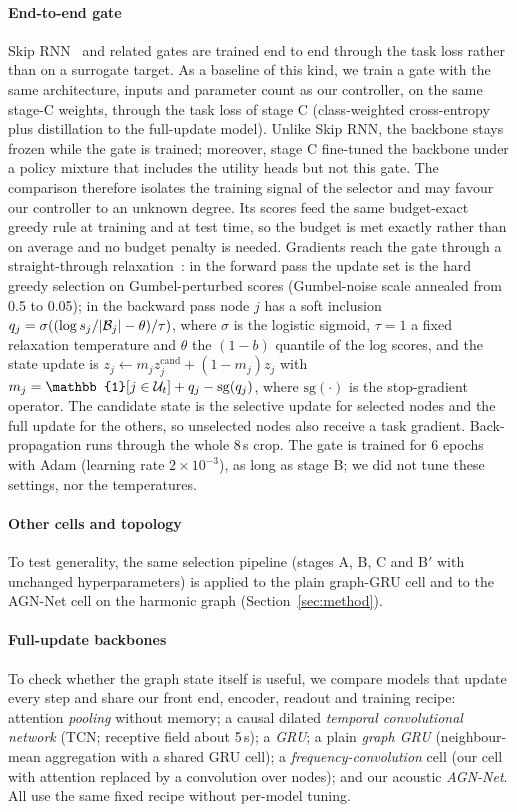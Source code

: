 \paragraph*{End-to-end gate} Skip RNN~\cite{campos2018skip} and related gates are trained end to end through the task loss rather than on a surrogate target. As a baseline of this kind, we train a gate with the same architecture, inputs and parameter count as our controller, on the same stage-C weights, through the task loss of stage C (class-weighted cross-entropy plus distillation to the full-update model). Unlike Skip RNN, the backbone stays frozen while the gate is trained; moreover, stage C fine-tuned the backbone under a policy mixture that includes the utility heads but not this gate. The comparison therefore isolates the training signal of the selector and may favour our controller to an unknown degree. Its scores feed the same budget-exact greedy rule at training and at test time, so the budget is met exactly rather than on average and no budget penalty is needed. Gradients reach the gate through a straight-through relaxation~\cite{bengio2013estimating,jang2017categorical}: in the forward pass the update set is the hard greedy selection on Gumbel-perturbed scores (Gumbel-noise scale annealed from 0.5 to 0.05); in the backward pass node $j$ has a soft inclusion $q_j=\sigma((\log s_j/|\mathcal{B}_j|-\theta)/\tau)$, where $\sigma$ is the logistic sigmoid, $\tau{=}1$ a fixed relaxation temperature and $\theta$ the $(1-b)$ quantile of the log scores, and the state update is $z_j\leftarrow m_j z^{\mathrm{cand}}_j+(1-m_j)z_j$ with $m_j=\mathbb{1}[j\in\U_t]+q_j-\mathrm{sg}(q_j)$, where $\mathrm{sg}(\cdot)$ is the stop-gradient operator. The candidate state is the selective update for selected nodes and the full update for the others, so unselected nodes also receive a task gradient. Back-propagation runs through the whole 8\,s crop. The gate is trained for 6 epochs with Adam (learning rate $2{\times}10^{-3}$), as long as stage B; we did not tune these settings, nor the temperatures.

\paragraph*{Other cells and topology} To test generality, the same selection pipeline (stages A, B, C and B$'$ with unchanged hyperparameters) is applied to the plain graph-GRU cell and to the AGN-Net cell on the harmonic graph (Section~\ref{sec:method}).

\paragraph*{Full-update backbones} To check whether the graph state itself is useful, we compare models that update every step and share our front end, encoder, readout and training recipe: attention \emph{pooling} without memory; a causal dilated \emph{temporal convolutional network} (TCN; receptive field about 5\,s); a \emph{GRU}; a plain \emph{graph GRU} (neighbour-mean aggregation with a shared GRU cell); a \emph{frequency-convolution} cell (our cell with attention replaced by a convolution over nodes); and our acoustic \emph{AGN-Net}. All use the same fixed recipe without per-model tuning.

